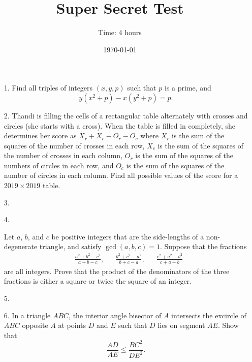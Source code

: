 \documentclass{article}
\title{Super Secret Test} %
\author{Time: 4 hours}
\date{\today} %
\begin{document}
 \maketitle
\begin{enumerate}

\item[1.] %
	Find all triples of integers $(x, y, p)$ such that $p$ is a prime, and
	\[
			y(x^2 + p) - x(y^2 + p) = p.
	\]


\item[2.] %
	Thandi is filling the cells of a rectangular table alternately with crosses and circles (she starts with a cross).
	When the table is filled in completely, she determines her score as $X_r+X_c-O_r-O_c$ where $X_r$ is the sum of the squares of the number of crosses in each row, $X_c$ is the sum of the squares of the number of crosses in each column, $O_r$ is the sum of the squares of the numbers of circles in each row, and $O_c$ is the sum of the squares of the number of circles in each column.
	Find all possible values of the score for a $2019 \times 2019$ table.


\item[3.]


\item[4.] %

Let $a$, $b$, and $c$ be positive integers that are the side-lengths of a non-degenerate triangle, and satisfy $\gcd(a, b, c) = 1$. Suppose that the fractions
\begin{align*}
	& \frac{a^2 + b^2 - c^2}{a + b - c}, && \frac{b^2 + c^2 - a^2}{b + c - a}, && \frac{c^2 + a^2 - b^2}{c + a - b}
\end{align*}
are all integers. Prove that the product of the denominators of the three fractions is either a square or twice the square of an integer.


\item[5.]


\item[6.] %
	In a triangle $ABC$, the interior angle bisector of $A$ intersects the excircle of $ABC$ opposite $A$ at points $D$ and $E$ such that $D$ lies on segment $AE$. Show that
	\[
		\frac{AD}{AE} \leq \frac{BC^2}{DE^2}.
	\]


\end{enumerate}
\end{document}
